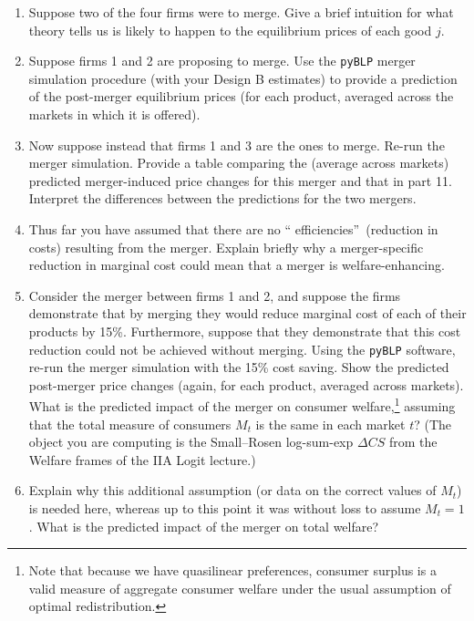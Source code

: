 \documentclass[english,11pt]{article}
\begin{document}
\begin{enumerate}
\item[10.] Suppose two of the four firms were to merge. Give a brief
intuition for what theory tells us is likely to happen to the equilibrium
prices of each good $j$.

\item[11.] Suppose firms 1 and 2 are proposing to merge. Use the \texttt{pyBLP}
merger simulation procedure (with your Design B estimates) to provide a prediction of the post-merger
equilibrium prices (for each product, averaged across the markets in which it is offered).

\item[12.] Now suppose instead that firms 1 and 3 are the ones to merge.
Re-run the merger simulation. Provide a table comparing the (average
across markets) predicted merger-induced price changes for this merger and
that in part 11. Interpret the differences between the predictions for the
two mergers.

\item[13.] Thus far you have assumed that there are no \textquotedblleft
efficiencies\textquotedblright\ (reduction in costs) resulting from the
merger. Explain briefly why a merger-specific reduction in marginal cost
could mean that a merger is welfare-enhancing.

\item[14.] Consider the merger between firms 1 and 2, and suppose the firms
demonstrate that by merging they would reduce marginal cost of each of their
products by 15\%. Furthermore, suppose that they demonstrate that this cost
reduction could not be achieved without merging.    Using the \texttt{pyBLP} software, re-run the merger simulation
with the 15\% cost saving. Show the predicted post-merger price changes (again,
for each product, averaged across markets). What is the predicted impact of
the merger on consumer welfare,\footnote{%
Note that because we have quasilinear preferences, consumer surplus is a
valid measure of aggregate consumer welfare under the usual assumption of
optimal redistribution.} assuming that the total measure of consumers $%
M_{t} $ is the same in each market  $t$?  (The object you are computing is
the Small--Rosen log-sum-exp $\Delta CS$ from the Welfare frames of the IIA
Logit lecture.)
\item[15.] Explain why this additional assumption
(or data on the correct values of $M_{t}$) is needed here, whereas up to
this point it was without loss to assume $M_{t}=1$. What is the predicted
impact of the merger on total welfare?
\end{enumerate}
\end{document}
